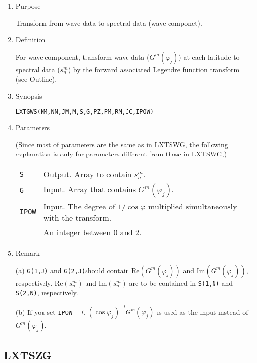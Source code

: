 \documentclass[a4paper]{scrartcl}
\begin{document}
\begin{enumerate}

\item Purpose 

Transform from wave data to spectral data (wave componet).

\item Definition

For wave component, transform wave data ($G^m(\varphi_j)$) 
at each latitude
to spectral data ($s^m_n$) 
by the forward associated Legendre function transform (see Outline).

\item Synopsis 

\texttt{LXTGWS(NM,NN,JM,M,S,G,PZ,PM,RM,JC,IPOW)}

\item Parameters

(Since most of parameters are the same as in LXTSWG,
the following explanation is only for parameters
different from those in LXTSWG,)

\begin{tabular}{ll}
\texttt{S} & Output. Array to contain $s^m_n$.\\
\texttt{G} & Input. Array that 
contains $G^m(\varphi_j)$.\\
\texttt{IPOW} & Input. 
The degree of $1/\cos\varphi$ multiplied 
simultaneously with the transform. \\
&  An integer between 0 and 2.
\end{tabular}

\item Remark

  (a)
\texttt{G(1,J)} and \texttt{G(2,J)}should 
contain $\mbox{Re}(G^m(\varphi_j))$ and 
$\mbox{Im}(G^m(\varphi_j))$, respectively.
$\mbox{Re}(s^m_n)$ and $\mbox{Im}(s^m_n)$
are to be contained in \texttt{S(1,N)} and \texttt{S(2,N)}, respectively.

(b) If you set \texttt{IPOW}$=l$, 
$(\cos\varphi_j)^{-l}G^m(\varphi_j)$ is used as the input
instead of $G^m(\varphi_j)$.

\end{enumerate}


\subsection{LXTSZG}
\end{document}
